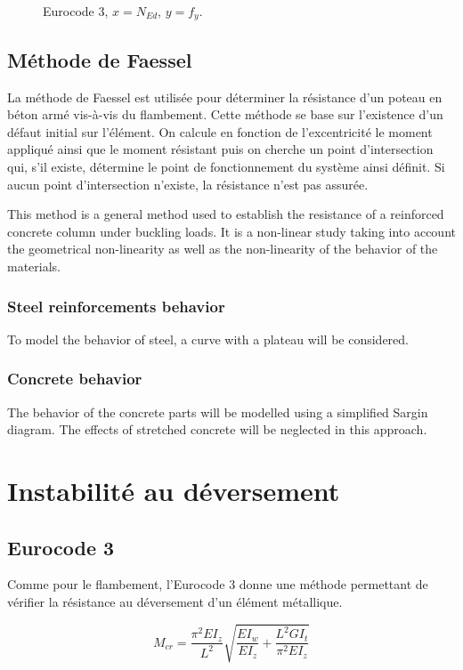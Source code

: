 \documentclass{report}
\begin{document}
\begin{figure}[!ht]
    \centering
    
    \caption{Eurocode 3, $x=N_{Ed}$, $y=f_y$.}\label{fig:res2}
\end{figure}

\subsection{Méthode de Faessel}

La méthode de Faessel est utilisée pour déterminer la résistance d'un poteau en béton armé vis-à-vis du flambement. Cette méthode se base sur l'existence d'un défaut initial sur l'élément. On calcule en fonction de l'excentricité le moment appliqué ainsi que le moment résistant puis on cherche un point d'intersection qui, s'il existe, détermine le point de fonctionnement du système ainsi définit. Si aucun point d'intersection n'existe, la résistance n'est pas assurée.

This method is a general method used to establish the resistance of a reinforced concrete column under buckling loads.
It is a non-linear study  taking into account the geometrical non-linearity as well as the non-linearity of the behavior of the materials.

\subsubsection{Steel reinforcements behavior}
To model the behavior of steel, a curve with a plateau will be considered.

\subsubsection{Concrete behavior}
The behavior of the concrete parts will be modelled using a simplified Sargin diagram.
The effects of stretched concrete will be neglected in this approach.

\section{Instabilité au déversement}
\subsection{Eurocode 3}
Comme pour le flambement, l'Eurocode 3 donne une méthode permettant de vérifier la résistance au déversement d'un élément métallique.

\begin{dmath}
    M_{cr}=\frac{\pi^2 EI_z}{L^2}\sqrt{\frac{EI_w}{EI_z}+\frac{L^2GI_t}{\pi^2EI_z}}
\end{dmath}
\end{document}
